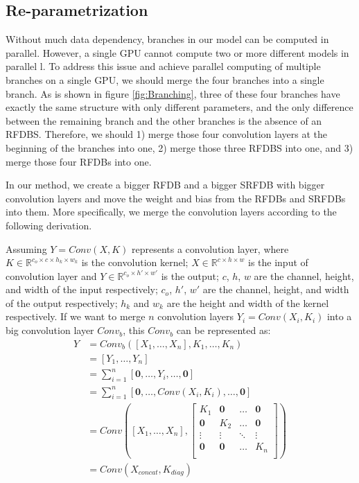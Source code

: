 \documentclass[10pt,twocolumn,letterpaper]{article}
\begin{document}
\subsection{Re-parametrization}
Without much data dependency, branches in our model can be computed in parallel. 
However, a single GPU cannot compute two or more different models in parallel
l. 
To address this issue and achieve parallel computing of multiple branches on a single GPU, we should merge the four branches into a single branch. 
As is shown in figure \ref{fig:Branching}, three of these four branches have exactly the same structure with only different parameters, and the only difference between the remaining branch and the other branches is the absence of an RFDBS.
Therefore, we should 1) merge those four convolution layers at the beginning of the branches into one, 2) merge those three RFDBS into one, and 3) merge those four RFDBs into one.

In our method, we create a bigger RFDB and a bigger SRFDB with bigger convolution layers and move the weight and bias from the RFDBs and SRFDBs into them.
More specifically, we merge the convolution layers according to the following derivation.

Assuming $Y=Conv(X, K)$ represents a convolution layer,
where $K\in\mathbb{R}^{c_o\times c\times h_k\times w_k}$ is the convolution kernel; $X\in\mathbb{R}^{c\times h\times w}$ is the input of convolution layer and $Y\in\mathbb{R}^{c_o\times h'\times w'}$ is the output; 
$c$, $h$, $w$ are the channel, height, and width of the input respectively; 
$c_o$, $h'$, $w'$ are the channel, height, and width of the output respectively;
$h_k$ and $w_k$ are the height and width of the kernel respectively.
If we want to merge $n$ convolution layers $Y_i=Conv(X_i, K_i)$ into a big convolution layer $Conv_b$, this $Conv_b$ can be represented as:
\begin{equation}
  \begin{aligned}
    Y&=Conv_b([X_1,\dots,X_n], K_1,\dots,K_n)\\
    &=[Y_1,\dots,Y_n]\\
    &=\sum_{i=1}^n[\bm 0,\dots,Y_i,\dots,\bm 0]\\
    &=\sum_{i=1}^n[\bm 0,\dots,Conv(X_i, K_i),\dots,\bm 0]\\
    &=Conv([X_1,\dots,X_n], 
    \begin{bmatrix}
      K_1 & \bm 0 & \dots & \bm 0 \\
      \bm 0 & K_2 & \dots & \bm 0 \\
      \vdots & \vdots & \ddots & \vdots \\
      \bm 0 & \bm 0 & \dots & K_n \\
    \end{bmatrix})\\
    &=Conv(X_{concat}, K_{diag})
  \end{aligned}
\end{equation}
\end{document}
